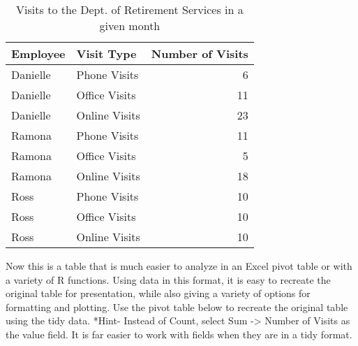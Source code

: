 \documentclass[]{book}
\newenvironment{Shaded}{\begin{snugshade}}{\end{snugshade}}
\newcommand{\KeywordTok}[1]{\textcolor[rgb]{0.13,0.29,0.53}{\textbf{#1}}}
\newcommand{\DataTypeTok}[1]{\textcolor[rgb]{0.13,0.29,0.53}{#1}}
\newcommand{\StringTok}[1]{\textcolor[rgb]{0.31,0.60,0.02}{#1}}
\newcommand{\CommentTok}[1]{\textcolor[rgb]{0.56,0.35,0.01}{\textit{#1}}}
\newcommand{\OperatorTok}[1]{\textcolor[rgb]{0.81,0.36,0.00}{\textbf{#1}}}
\newcommand{\NormalTok}[1]{#1}
\begin{document}
\begin{Shaded}
\end{Shaded}

\begin{table}

\caption{\label{tab:unnamed-chunk-4}Visits to the Dept. of Retirement Services in a given month}
\centering
\begin{tabular}[t]{l|l|r}
\hline
Employee & Visit Type & Number of Visits\\
\hline
Danielle & Phone Visits & 6\\
\hline
Danielle & Office Visits & 11\\
\hline
Danielle & Online Visits & 23\\
\hline
Ramona & Phone Visits & 11\\
\hline
Ramona & Office Visits & 5\\
\hline
Ramona & Online Visits & 18\\
\hline
Ross & Phone Visits & 10\\
\hline
Ross & Office Visits & 10\\
\hline
Ross & Online Visits & 10\\
\hline
\end{tabular}
\end{table}

Now this is a table that is much easier to analyze in an Excel pivot
table or with a variety of R functions. Using data in this format, it is
easy to recreate the original table for presentation, while also giving
a variety of options for formatting and plotting. Use the pivot table
below to recreate the original table using the tidy data. *Hint- Instead
of Count, select Sum -\textgreater{} Number of Visits as the value
field. It is far easier to work with fields when they are in a tidy
format.
\end{document}
